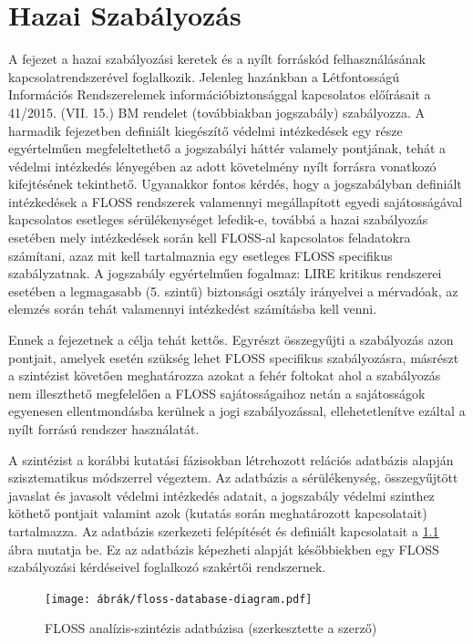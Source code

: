 \documentclass[12pt,magyar,a4paper,oneside]{scrreprt}
\begin{document}
\hypertarget{hazai-szabuxe1lyozuxe1s}{%
\chapter{Hazai Szabályozás}\label{hazai-szabuxe1lyozuxe1s}}

A fejezet a hazai szabályozási keretek és a nyílt forráskód
felhasználásának kapcsolatrendszerével foglalkozik. Jelenleg hazánkban a
Létfontosságú Információs Rendszerelemek információbiztonsággal
kapcsolatos előírásait a 41/2015. (VII. 15.) BM rendelet (továbbiakban
jogszabály) szabályozza. A harmadik fejezetben definiált kiegészítő
védelmi intézkedések egy része egyértelműen megfeleltethető a
jogszabályi háttér valamely pontjának, tehát a védelmi intézkedés
lényegében az adott követelmény nyílt forrásra vonatkozó kifejtésének
tekinthető. Ugyanakkor fontos kérdés, hogy a jogszabályban definiált
intézkedések a FLOSS rendszerek valamennyi megállapított egyedi
sajátosságával kapcsolatos esetleges sérülékenységet lefedik-e, továbbá
a hazai szabályozás esetében mely intézkedések során kell FLOSS-al
kapcsolatos feladatokra számítani, azaz mit kell tartalmaznia egy
esetleges FLOSS specifikus szabályzatnak. A jogszabály egyértelműen
fogalmaz: LIRE kritikus rendszerei esetében a legmagasabb (5. szintű)
biztonsági osztály irányelvei a mérvadóak, az elemzés során tehát
valamennyi intézkedést számításba kell venni.

Ennek a fejezetnek a célja tehát kettős. Egyrészt összegyűjti a
szabályozás azon pontjait, amelyek esetén szükség lehet FLOSS specifikus
szabályozásra, másrészt a szintézist követően meghatározza azokat a
fehér foltokat ahol a szabályozás nem illeszthető megfelelően a FLOSS
sajátosságaihoz netán a sajátosságok egyenesen ellentmondásba kerülnek a
jogi szabályozással, ellehetetlenítve ezáltal a nyílt forrású rendszer
használatát.

A szintézist a korábbi kutatási fázisokban létrehozott relációs
adatbázis alapján szisztematikus módszerrel végeztem. Az adatbázis a
sérülékenység, összegyűjtött javaslat és javasolt védelmi intézkedés
adatait, a jogszabály védelmi szinthez köthető pontjait valamint azok
(kutatás során meghatározott kapcsolatait) tartalmazza. Az adatbázis
szerkezeti felépítését és definiált kapcsolatait a \ref{fig:FLOSSDB}
ábra mutatja be. Ez az adatbázis képezheti alapját későbbiekben egy
FLOSS szabályozási kérdéseivel foglalkozó szakértői rendszernek.

\begin{figure}
\hypertarget{fig:FLOSSDB}{%
\centering
\texttt{[image: ábrák/floss-database-diagram.pdf]}
\caption{FLOSS analízis-szintézis adatbázisa (szerkesztette a
szerző)}\label{fig:FLOSSDB}
}
\end{figure}
\end{document}
